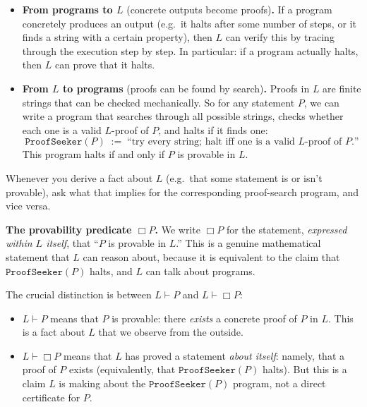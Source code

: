 \documentclass[11pt]{article}
\begin{document}
\begin{itemize}
  \item \textbf{From programs to $L$} (concrete outputs become proofs)\textbf{.} If a
    program concretely produces an output (e.g.\ it halts after some number of steps,
    or it finds a string with a certain property), then $L$ can verify this by tracing
    through the execution step by step. In particular: if a program actually halts,
    then $L$ can prove that it halts.

  \item \textbf{From $L$ to programs} (proofs can be found by search)\textbf{.} Proofs
    in $L$ are finite strings that can be checked mechanically. So for any statement
    $P$, we can write a program that searches through all possible strings, checks
    whether each one is a valid $L$-proof of $P$, and halts if it finds one:
    \[
      \texttt{ProofSeeker}(P) \;:=\;
      \text{``try every string; halt iff one is a valid $L$-proof of $P$.''}
    \]
    This program halts if and only if $P$ is provable in $L$.
\end{itemize}

\medskip
\noindent
Whenever you derive a fact about $L$ (e.g.\ that some statement is or isn't provable),
ask what that implies for the corresponding proof-search program, and vice versa.

\medskip
\noindent
\textbf{The provability predicate $\Box P$.} We write $\Box P$ for the statement,
\emph{expressed within $L$ itself}, that ``$P$ is provable in $L$.'' This is a genuine
mathematical statement that $L$ can reason about, because it is equivalent to the claim
that $\texttt{ProofSeeker}(P)$ halts, and $L$ can talk about programs.

\medskip
\noindent
The crucial distinction is between $L \vdash P$ and $L \vdash \Box P$:

\begin{itemize}
  \item $L \vdash P$ means that $P$ is provable: there \emph{exists} a concrete proof
    of $P$ in $L$. This is a fact about $L$ that we observe from the outside.

  \item $L \vdash \Box P$ means that $L$ has proved a statement \emph{about itself}:
    namely, that a proof of $P$ exists (equivalently, that
    $\texttt{ProofSeeker}(P)$ halts). But this is a claim $L$ is making about
    the  $\texttt{ProofSeeker}(P)$ program, not a direct certificate for $P$.
\end{itemize}
\end{document}
